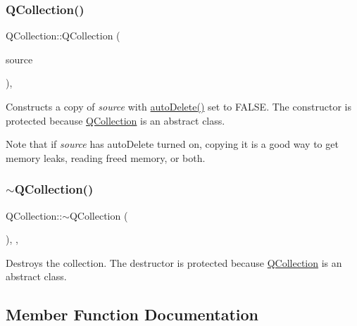 \subsubsection{\texorpdfstring{QCollection()}{QCollection()}\hspace{0.1cm}{\footnotesize\ttfamily [2/2]}}
{\footnotesize\ttfamily Q\+Collection\+::\+Q\+Collection (\begin{DoxyParamCaption}\item[{const \mbox{\hyperlink{class_q_collection}{Q\+Collection}} \&}]{source }\end{DoxyParamCaption})\hspace{0.3cm}{\ttfamily [inline]}, {\ttfamily [protected]}}

Constructs a copy of {\itshape source} with \mbox{\hyperlink{class_q_collection_a18a880ce3024c10ccf53509ba27170ac}{auto\+Delete()}} set to F\+A\+L\+SE. The constructor is protected because \mbox{\hyperlink{class_q_collection}{Q\+Collection}} is an abstract class.

Note that if {\itshape source} has auto\+Delete turned on, copying it is a good way to get memory leaks, reading freed memory, or both. \mbox{\label{class_q_collection_af8783f52bdb06ce53cb8a86df70af159}} 
\subsubsection{\texorpdfstring{$\sim$QCollection()}{~QCollection()}}
{\footnotesize\ttfamily Q\+Collection\+::$\sim$\+Q\+Collection (\begin{DoxyParamCaption}{ }\end{DoxyParamCaption})\hspace{0.3cm}{\ttfamily [inline]}, {\ttfamily [protected]}, {\ttfamily [virtual]}}

Destroys the collection. The destructor is protected because \mbox{\hyperlink{class_q_collection}{Q\+Collection}} is an abstract class. 

\subsection{Member Function Documentation}
\mbox{\label{class_q_collection_a18a880ce3024c10ccf53509ba27170ac}} 
